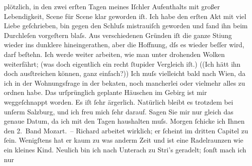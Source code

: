 \begin{ledgroupsized}[t]{13cm}
                    plötzlich, in den zwei erſten Tagen meines Iſchler {\pb}Aufenthalts mit großer
                    Lebendigkeit, Scene für Scene klar geworden iſt. Ich habe den erſten Akt mit viel Liebe
                    geſchrieben, bin gegen den Schluſs mistrauiſch geworden und fand ihn beim
                    Durchleſen vorgeſtern blaſs. Aus verschiedenen Gründen iſt die ganze Sti{\geminationm}ung wieder ins dunklere hineingerathen, aber die
                    Hoffnung, dſs es wieder beſſer wird, darf beſtehn. Ich werde weiter arbeiten,
                    wie man unter drohenden Wolken weiterfährt; (was doch eigentlich ein recht
                    ſtupider Vergleich iſt.) ((Ich hätt ihn doch ausſtreichen können, ganz
                    einfach?)) \pend
           \pstart
           {\pb}Ich muſs vielleicht bald nach Wien, da ich in der Wohnungsfrage in der beka{\geminationn}ten, noch mancherlei oder vielmehr alles zu
                    ordnen habe. Das urſprünglich geplante Häuschen im Gebirg ist mir weggeſchnappt
                    worden. Es iſt ſehr ärgerlich. Natürlich bleibt es trotzdem bei unſerm Salzburg, und ich freu mich ſehr darauf. Sagen
                    Sie mir nur gleich das genaue Datum, da ich mit den Tagen haushalten muſs.\pend
           \pstart
           Morgen ſchicke ich Ihnen den 2. Band Mozart. – Richard arbeitet wirklich; er
                    ſcheint im dritten Capitel
                    zu ſein. {\pb}Wenigſtens hat er kaum zu was anderm
                    Zeit und ist eine Radelraunzen wie ein kleines Kind.\pend
           \pstart
           Neulich bin ich nach Unterach zu Stri’s geradelt; ſonſt mach ich nur

\end{ledgroupsized}
